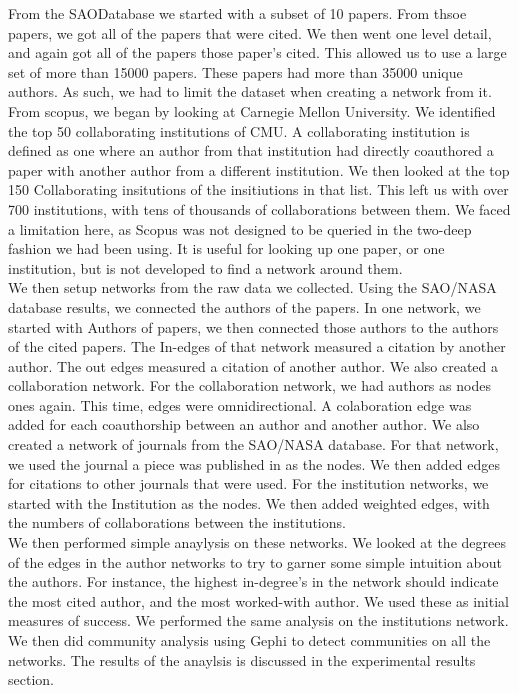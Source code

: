 \documentclass[times, 10pt,twocolumn]{article}
\begin{document}
From the SAO\NASA Database we started with a subset of 10 papers. From thsoe papers, we got all of the papers that were cited. We then went one level detail, and again got all of the papers those paper's cited. This allowed us to  use a large set  of more than 15000 papers. These papers had more than 35000 unique authors. As such, we had to limit the dataset when creating a network from it. \\

From scopus, we began by looking at Carnegie Mellon University. We identified the top 50 collaborating institutions of CMU. A collaborating institution is defined as one where an author from that institution had directly coauthored a paper with another author from a different institution. We then looked at the top 150 Collaborating insitutions of the insitiutions in that list. This left us with over 700 institutions, with tens of thousands of collaborations between them.  We faced a limitation here, as Scopus was not designed to be queried in the two-deep fashion we had been using. It is useful for looking up one paper, or one institution, but is not developed to find a network around them.\\

We then setup networks from the raw data we collected. Using the SAO/NASA database results, we connected the authors of the papers. In one network, we started with Authors of papers, we then connected those authors to the authors of the cited papers. The In-edges of that network measured a citation by another author. The out edges measured a citation of another author. We also created a collaboration network. For the collaboration network, we had authors as nodes ones again. This time, edges were omnidirectional. A colaboration edge was added for each coauthorship between an author and another author. We also created a network of journals from the SAO/NASA database. For that network, we used the journal a piece was published in as the nodes. We then added edges for citations to other journals that were used. For the institution networks, we started with the Institution as the nodes. We then added weighted edges, with the numbers of collaborations between the institutions.  \\

We then performed simple anaylysis on these networks. We looked at the degrees of the edges in the author networks to try to garner some simple intuition about the authors. For instance, the highest in-degree's in the network should indicate the most cited author, and the most worked-with author. We used these as initial measures of success. We performed the same analysis on the institutions network. We then did community analysis using Gephi to detect communities on all the networks. The results of the anaylsis is discussed in the experimental results section. \\
\end{document}
